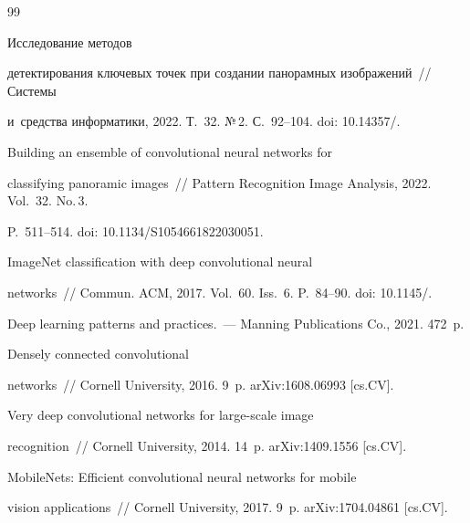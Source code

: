 {{\begin{thebibliography}{99}


 Исследование методов 


детектирования ключевых точек при создании панорамных изображений~/\!\!/ Системы 


и~средства информатики, 2022. Т.~32. №\,2. С.~92--104. doi: 10.14357\!/.













 Building an ensemble of convolutional neural networks for 


classifying panoramic images~/\!\!/ Pattern Recognition Image Analysis, 2022. Vol.~32. No.\,3.  


P.~511--514. doi: 10.1134\!/\!S1054661822030051.




 ImageNet classification with deep convolutional neural 


networks~/\!\!/ Commun. ACM, 2017. Vol.~60. Iss.~6. P.~84--90. doi: 10.1145\!/.




 Deep learning patterns and practices.~--- Manning Publications Co., 2021. 472~p.




 Densely connected convolutional 


networks~/\!\!/ Cornell University, 2016. 9~p. \mbox{arXiv}:1608.06993 [cs.CV].




 Very deep convolutional networks for large-scale image 


recognition~/\!\!/ Cornell University, 2014. 14~p. \mbox{arXiv}:1409.1556 [cs.CV].




 MobileNets: Efficient convolutional neural networks for mobile 


vision applications~/\!\!/ Cornell University, 2017. 9~p. \mbox{arXiv}:1704.04861 [cs.CV].





\end{thebibliography}}}
